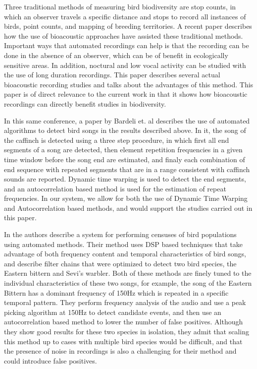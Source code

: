 Three traditional methods of measuring bird biodiversity are stop
counts, in which an observer travels a specific distance and stops to
record all instances of birds, point counts, \cite{bardeli10} and
mapping of breeding territories.  A recent paper \cite{frommolt08}
describes how the use of bioacoustic approaches have assisted these
traditional methods.  Important ways that automated recordings can
help is that the recording can be done in the absence of an observer,
which can be of benefit in ecologically sensitive areas.  In addition,
noctural and low vocal activity can be studied with the use of long
duration recordings.  This paper describes several actual bioacoustic
recording studies and talks about the advantages of this method.  This
paper is of direct relevance to the current work in that it shows how
bioacoustic recordings can directly benefit studies in biodiversity.

In this same conference, a paper by Bardeli et. al \cite{bardeli08}
describes the use of automated algorithms to detect bird songs in the
results described above.  In it, the song of the caffinch is detected
using a three step procedure, in which first all end segments of a
song are detected, then element repetition frequencies in a given time
window before the song end are estimated, and finaly each combination
of end sequence with repeated segments that are in a range consistent
with caffinch sounds are reported.  Dynamic time warping is used to
detect the end segments, and an autocorrelation based method is used
for the estimation of repeat frequencies.  In our system, we allow for
both the use of Dynamic Time Warping and Autocorrelation based
methods, and would support the studies carried out in this paper.

In \cite{bardeli10} the authors describe a system for performing
censuses of bird populations using automated methods.  Their method
uses DSP based techniques that take advantage of both frequency
content and temporal characteristics of bird songs, and describe
filter chains that were optimized to detect two bird species, the
Eastern bittern and Sevi's warbler.  Both of these methods are finely
tuned to the individual characteristics of these two songs, for
example, the song of the Eastern Bittern has a dominant frequency of
150Hz which is repeated in a specific temporal pattern.  They perform
frequency analysis of the audio and use a peak picking algorithm at
150Hz to detect candidate events, and then use an autocorrelation
based method to lower the number of false positives.  Although they
show good results for these two species in isolation, they admit that
scaling this method up to cases with multiple bird species would be
difficult, and that the presence of noise in recordings is also a
challenging for their method and could introduce false positives.


